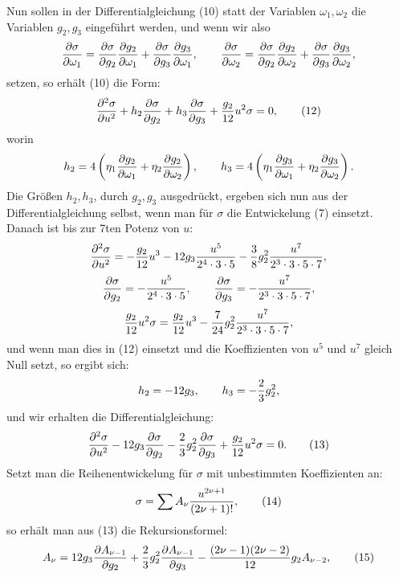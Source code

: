 \documentclass[11pt]{article}
\begin{document}
Nun sollen in der Differentialgleichung (10) statt der Variablen $\omega_1,\omega_2$ die Variablen $g_2,g_3$ eingeführt werden, und wenn wir also
\[
{\partial\sigma\over\partial\omega_1}={\partial\sigma\over\partial g_2}{\partial g_2\over\partial\omega_1}+{\partial\sigma\over\partial g_3}{\partial g_3\over\partial\omega_1},
\qquad
{\partial\sigma\over\partial\omega_2}={\partial\sigma\over\partial g_2}{\partial g_2\over\partial\omega_2}+{\partial\sigma\over\partial g_3}{\partial g_3\over\partial\omega_2},
\]
setzen, so erhält (10) die Form:
\begin{equation}
{\partial^2\sigma\over\partial u^2}
+h_2{\partial\sigma\over\partial g_2}
+h_3{\partial\sigma\over\partial g_3}
+{g_2\over12}u^2\sigma=0,
\tag{12}
\end{equation}
worin
\[
h_2=4\left(\eta_1{\partial g_2\over\partial\omega_1}+\eta_2{\partial g_2\over\partial\omega_2}\right),
\qquad
h_3=4\left(\eta_1{\partial g_3\over\partial\omega_1}+\eta_2{\partial g_3\over\partial\omega_2}\right).
\]
Die Größen $h_2,h_3$, durch $g_2,g_3$ ausgedrückt, ergeben sich nun aus der Differentialgleichung selbst, wenn man für $\sigma$ die Entwickelung (7) einsetzt. Danach ist bis zur 7ten Potenz von $u$:
\[
{\partial^2\sigma\over\partial u^2}=-{g_2\over12}u^3
-12g_3{u^5\over2^4\cdot3\cdot5}
-{3\over8}g_2^2{u^7\over2^3\cdot3\cdot5\cdot7},
\]
\[
{\partial\sigma\over\partial g_2}=-{u^5\over2^4\cdot3\cdot5},
\qquad
{\partial\sigma\over\partial g_3}=-{u^7\over2^3\cdot3\cdot5\cdot7},
\]
\[
{g_2\over12}u^2\sigma={g_2\over12}u^3
-{7\over24}g_2^2{u^7\over2^3\cdot3\cdot5\cdot7},
\]
und wenn man dies in (12) einsetzt und die Koeffizienten von $u^5$ und $u^7$ gleich Null setzt, so ergibt sich:
\[
h_2=-12g_3,
\qquad
h_3=-{2\over3}g_2^2,
\]
und wir erhalten die Differentialgleichung:
\begin{equation}
{\partial^2\sigma\over\partial u^2}
-12g_3{\partial\sigma\over\partial g_2}
-{2\over3}g_2^2{\partial\sigma\over\partial g_3}
+{g_2\over12}u^2\sigma=0.
\tag{13}
\end{equation}
Setzt man die Reihenentwickelung für $\sigma$ mit unbestimmten Koeffizienten an:
\begin{equation}
\sigma=\sum A_\nu{u^{2\nu+1}\over(2\nu+1)!},
\tag{14}
\end{equation}
so erhält man aus (13) die Rekursionsformel:
\begin{equation}
A_\nu=12g_3{\partial A_{\nu-1}\over\partial g_2}
+{2\over3}g_2^2{\partial A_{\nu-1}\over\partial g_3}
-{(2\nu-1)(2\nu-2)\over12}g_2A_{\nu-2},
\tag{15}
\end{equation}
\end{document}
